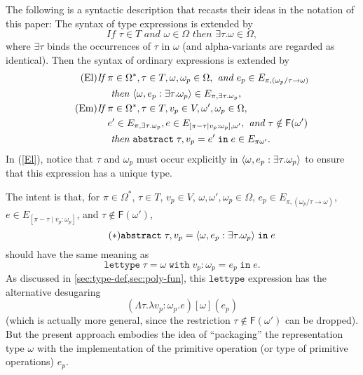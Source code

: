 \documentclass[sigplan,screen,nonacm,balance=false]{acmart}
\theoremstyle{plain}
\DeclarePairedDelimiter{\pair}{\langle}{\rangle}
\newcommand{\lettype}{\mathtt{lettype}}
\newcommand{\letwith}[6]{\mathtt{lettype} \; #1 = #2 \; \mathtt{with} \; #3 : #4 = #5 \; \mathtt{in} \; #6}
\newcommand{\abstractin}[4]{\mathtt{abstract} \; #1, #2 = #3 \; \mathtt{in} \; #4}
\newcommand{\FV}{\mathsf{F}}
\begin{document}
The following is a syntactic description that recasts their ideas in the notation of this paper:
The syntax of type expressions is extended by
%
\begin{equation*}\tag{$\Omega 6$}
  \textit{If } \tau \in T \textit{ and } \omega \in \Omega \textit{ then } \exists \tau. \omega \in \Omega,
\end{equation*}
%
where $\exists \tau$ binds the occurrences of $\tau$ in $\omega$ (and alpha-variants are regarded as identical).
Then the syntax of ordinary expressions is extended by
%
\begin{align*}
  \tag{El} \label{El}
  \textit{If } & \pi \in \Omega^*, \tau \in T, \omega, \omega_p \in \Omega, \textit{ and } e_p \in E_{\pi, (\omega_p/\tau \to \omega)} \\
  & \textit{ then } \pair{\omega, e_p : \exists \tau. \omega_p} \in E_{\pi, \exists \tau. \omega_p}, \\
  \tag{Em}
  \textit{If } & \pi \in \Omega^*, \tau \in T, v_p \in V, \omega', \omega_p \in \Omega, \\
  & e' \in E_{\pi, \exists \tau. \omega_p}, e \in E_{[\pi - \tau \mid v_p : \omega_p], \omega'}, \textit{ and } \tau \notin \FV(\omega') \\
  & \textit{ then } \abstractin{\tau}{v_p}{e'}{e} \in E_{\pi \omega'}.
\end{align*}
%
In (\ref{El}), notice that $\tau$ and $\omega_p$ must occur explicitly in $\pair{\omega, e_p : \exists \tau. \omega_p}$ to ensure that this expression has a unique type.

The intent is that, for $\pi \in \Omega^*$, $\tau \in T$, $v_p \in V$, $\omega, \omega', \omega_p \in \Omega$, $e_p \in E_{\pi, (\omega_p/\tau \to \omega)}$, $e \in E_{[\pi - \tau \mid v_p : \omega_p]}$, and $\tau \notin \FV(\omega')$,
%
\begin{equation*}\tag{$\ast$}\label{star}
  \abstractin{\tau}{v_p}{\pair{\omega, e_p : \exists \tau. \omega_p}}{e}
\end{equation*}
%
should have the same meaning as
%
\begin{equation*}
  \letwith{\tau}{\omega}{v_p}{\omega_p}{e_p}{e}.
\end{equation*}
%
As discussed in \cref{sec:type-def,sec:poly-fun}, this $\lettype$ expression has the alternative desugaring
%
\begin{equation*}\tag{$\ast\ast$}\label{starstar}
  (\Lambda \tau. \lambda v_p: \omega_p. e)[\omega](e_p)
\end{equation*}
%
(which is actually more general, since the restriction $\tau \notin \FV(\omega')$ can be dropped).
But the present approach embodies the idea of ``packaging'' the representation type $\omega$ with the implementation of the primitive operation (or type of primitive operations) $e_p$.
\end{document}
